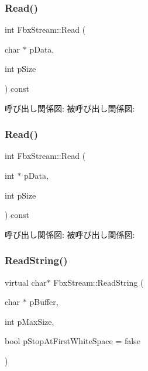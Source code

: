 \subsubsection{\texorpdfstring{Read()}{Read()}\hspace{0.1cm}{\footnotesize\ttfamily [2/3]}}
{\footnotesize\ttfamily int Fbx\+Stream\+::\+Read (\begin{DoxyParamCaption}\item[{char $\ast$}]{p\+Data,  }\item[{int}]{p\+Size }\end{DoxyParamCaption}) const}

呼び出し関係図\+:
被呼び出し関係図\+:
\mbox{\label{class_fbx_stream_afeadb32985899a9d3eb21aead9bbb546}} 
\subsubsection{\texorpdfstring{Read()}{Read()}\hspace{0.1cm}{\footnotesize\ttfamily [3/3]}}
{\footnotesize\ttfamily int Fbx\+Stream\+::\+Read (\begin{DoxyParamCaption}\item[{int $\ast$}]{p\+Data,  }\item[{int}]{p\+Size }\end{DoxyParamCaption}) const}

呼び出し関係図\+:
被呼び出し関係図\+:
\mbox{\label{class_fbx_stream_a9c72065cd571b54b1cbcd6dfa89adb32}} 
\subsubsection{\texorpdfstring{Read\+String()}{ReadString()}}
{\footnotesize\ttfamily virtual char$\ast$ Fbx\+Stream\+::\+Read\+String (\begin{DoxyParamCaption}\item[{char $\ast$}]{p\+Buffer,  }\item[{int}]{p\+Max\+Size,  }\item[{bool}]{p\+Stop\+At\+First\+White\+Space = {\ttfamily false} }\end{DoxyParamCaption})\hspace{0.3cm}{\ttfamily [virtual]}}

